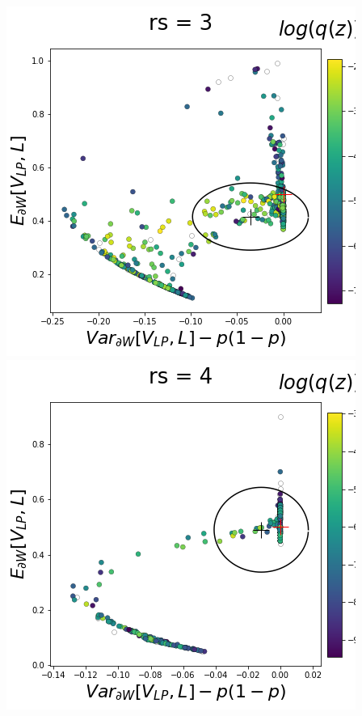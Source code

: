 \documentclass[11pt]{article}
\begin{document}
\begin{center}
\includegraphics[scale=0.33]{figs/T_x_SC_pvar_reduced_c=0_p=50_rs=3.png} \\
\includegraphics[scale=0.33]{figs/T_x_SC_pvar_reduced_c=0_p=50_rs=4.png}

\end{center}
\end{document}
